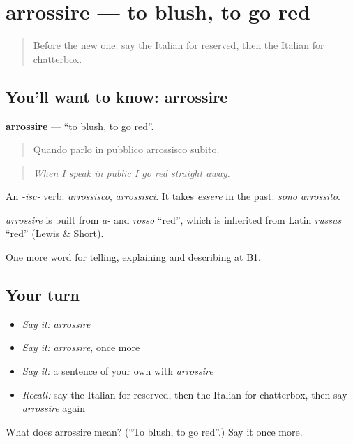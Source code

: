 \section[arrossire]{arrossire — to blush, to go red}

\label{lesson:IT-C471-arrossire}



\begin{quote}
Before the new one: say the Italian for reserved, then the Italian for chatterbox.
\end{quote}

\subsection*{You'll want to know: arrossire}
\textbf{arrossire} — \textquotedblleft{}to blush, to go red\textquotedblright{}.

\begin{quote}
Quando parlo in pubblico arrossisco subito.
\end{quote}

\begin{quote}
\emph{When I speak in public I go red straight away.}
\end{quote}

An \emph{-isc-} verb: \emph{arrossisco}, \emph{arrossisci}. It takes \emph{essere} in the past: \emph{sono arrossito}.

\begin{cousinweb}
\emph{arrossire} is built from \emph{a-} and \emph{rosso} \textquotedblleft{}red\textquotedblright{}, which is inherited from Latin \emph{russus} \textquotedblleft{}red\textquotedblright{} (Lewis \& Short).
\end{cousinweb}

\begin{grammarlens}[title={What you've built}]
One more word for telling, explaining and describing at B1.
\end{grammarlens}

\subsection*{Your turn}
\begin{itemize}
\raggedright
  \item \emph{Say it:} \emph{arrossire}
  \item \emph{Say it:} \emph{arrossire}, once more
  \item \emph{Say it:} a sentence of your own with \emph{arrossire}
  \item \emph{Recall:} say the Italian for reserved, then the Italian for chatterbox, then say \emph{arrossire} again
\end{itemize}

\begin{tcolorbox}[breakable,colback=teal!4,colframe=teal!35!black,title={Before you move on}]
What does arrossire mean? (\textquotedblleft{}To blush, to go red\textquotedblright{}.) Say it once more.
\end{tcolorbox}
